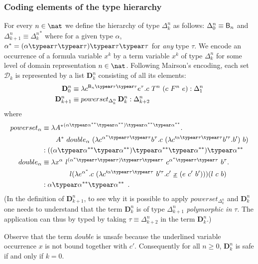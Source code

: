 \subsubsection{Coding elements of the type hierarchy}
For every $n\in\nat$ we define the hierarchy of type $\Delta_k^n$ as
follows: $\Delta_0^n \equiv \mathsf{B}_n$ and $\Delta_{k+1}^n \equiv
{\Delta_k^n}^*$ where for a given type $\alpha$, $\alpha^* = (\alpha
\typear \tau \typear \tau)\typear \tau \typear \tau$ for \emph{any} type $\tau$. We encode an occurrence of a formula variable $x^k$ by a term variable $x^k$
of type $\Delta_{k}^n$ for some level of domain representation
$n\in\nat$. Following Mairson's  encoding, each set $\mathcal{D}_k$
is represented by a list $\mathbf{D}_k^n$ consisting of all its
elements:
\begin{align*}
\mathbf{D}_0^n &\equiv \lambda c^{\booltype_n \typear \tau \typear \tau} e^\tau . c~T^n~(c~F^n~e) : \Delta_1^n \\
\mathbf{D}_{k+1}^n &\equiv powerset_{\Delta_k^n}\,\mathbf{D}_k^n : \Delta_{k+2}^n
\end{align*}
where
\begin{align*}
  powerset_\alpha &\equiv \lambda {A^*}^{(\alpha \typear \alpha^{**} \typear \alpha^{**}) \typear \alpha^{**} \typear \alpha^{**}}. \\
&\qquad  A^*~double_\alpha~(\lambda c^{\alpha^* \typear \tau\typear \tau} b^\tau . c~(\lambda c'^{\alpha\typear \tau\typear \tau} b'^\tau.b')~b)\\
 &: ((\alpha \typear \alpha^{**} \typear \alpha^{**}) \typear \alpha^{**} \typear \alpha^{**})\typear \alpha^{**} \\
  double_\alpha &\equiv \lambda x^\alpha~l^{(\alpha^* \typear \tau\typear \tau)\typear \tau\typear \tau}~ c^{\alpha^*\typear \tau\typear \tau}~b^\tau. \\
  & \qquad \qquad l(\lambda e^{\alpha^*}.c~(\lambda c'^{\alpha\typear \tau\typear \tau}~ b'^\tau.c'~\underline{x}~(e~c'~b')))(l~c~b)\\
 &: \alpha \typear \alpha^{**} \typear \alpha^{**} \enspace .
\end{align*}
(In the definition of $\mathbf{D}_{k+1}^n$, to see why it is possible
to apply $powerset_{\Delta_k^n}$ and $\mathbf{D}_k^n$ one needs to understand that the term $\mathbf{D}_k^n$ is of type $\Delta^n_{k+1}$ \emph{polymorphic in $\tau$}. The application can thus by typed by taking $\tau \equiv \Delta^n_{k+2}$ in the term
$\mathbf{D}_k^n$.)

Observe that the term $double$ is unsafe because the underlined variable occurrence $x$ is not bound together with $c'$. 
Consequently for all $n\geq0$, $\mathbf{D}_k^n$ is safe if and
only if $k=0$.


